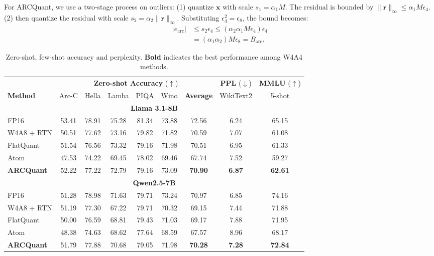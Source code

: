 \documentclass[11pt]{article}
\begin{document}
For ARCQuant, we use a two-stage process on outliers:
(1) quantize $\mathbf{x}$ with scale $s_1 = \alpha_1 M$. The residual is bounded by $\|\mathbf{r}\|_\infty \le \alpha_1 M \epsilon_4$. (2) then quantize the residual with scale $s_2 = \alpha_2 \|\mathbf{r}\|_\infty$. Substituting $\epsilon_4^2 = \epsilon_8$, the bound becomes: 
\begin{equation}
\begin{split}
    |e_{\text{arc}}|
&\le s_2 \epsilon_4 \le (\alpha_2 \alpha_1 M \epsilon_4) \epsilon_4 \\
              &= (\alpha_1 \alpha_2) M \epsilon_8 = B_{\text{arc}}. 
\end{split}
\end{equation}

\begin{table}[t]
\centering
\caption{Zero-shot, few-shot accuracy and perplexity. \textbf{Bold} indicates the best performance among W4A4 methods.}
\label{tab:main_results}
\begin{tabular}{l|cccccc|c|c} %
\toprule
 & \multicolumn{6}{c|}{\textbf{Zero-shot Accuracy} ($\uparrow$)} & \textbf{PPL} ($\downarrow$) & \textbf{MMLU} ($\uparrow$) \\
\textbf{Method} & Arc-C & Hella & Lamba & PIQA & Wino & \textbf{Average} & WikiText2 & 5-shot \\
\midrule
\multicolumn{9}{c}{\textbf{Llama 3.1-8B}} \\
\midrule
FP16 & 53.41 & 78.91 & 75.28 & 81.34 & 73.88 & 72.56 & 6.24 & 65.15 \\
W4A8 + RTN    & 50.51 & 77.62 & 73.16 & 79.82 & 71.82 & 70.59 & 7.07 & 61.08 \\
\cmidrule(lr){1-9} %
FlatQuant & 51.54 & 76.56 & 73.32 & 79.16 & 71.98 & 70.51 & 6.95 & 61.33 \\
Atom      & 47.53 & 74.22 & 69.45 & 78.02 & 69.46 & 67.74 & 7.52 & 59.27 \\
\rowcolor{lightpink} \textbf{ARCQuant} & 52.22 & 77.22 & 72.79 & 79.16 & 73.09 & \textbf{70.90} & \textbf{6.87} & \textbf{62.61} \\

\midrule \midrule %

\multicolumn{9}{c}{\textbf{Qwen2.5-7B}} \\
\midrule
FP16 & 51.28 & 78.98 & 71.63 & 79.71 & 73.24 & 70.97 & 6.85 & 74.16 \\
W4A8 + RTN    & 51.19 & 77.30 & 67.22 & 79.71 & 70.32 & 69.15 & 7.44 & 71.88 \\
\cmidrule(lr){1-9}
FlatQuant & 50.00 & 76.59 & 68.81 & 79.43 & 71.03 & 69.17 & 7.88 & 71.95 \\
Atom      & 48.38 & 74.63 & 68.62 & 77.64 & 68.59 & 67.57 & 8.96 & 68.17 \\
\rowcolor{lightpink} \textbf{ARCQuant} & 51.79 & 77.88 & 70.68 & 79.05 & 71.98 & \textbf{70.28} & \textbf{7.28} & \textbf{72.84} \\


\end{tabular}
\end{table}
\end{document}
